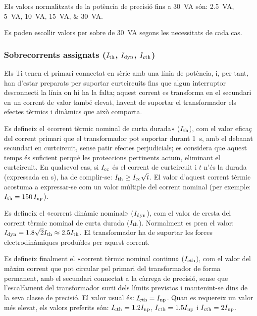  Els valors normalitzats de la potència de precisió fins a \qty{30}{VA}
són: \qtylist{2,5; 5;10; 15; 30}{VA}.

Es poden escollir valors per sobre de \qty{30}{VA} segons les necessitats de cada cas.

\subsubsection{Sobrecorrents  assignats ($I_\mathrm{th}$, $I_\mathrm{dyn}$, $I_\mathrm{cth}$)}

 Els Ti
tenen el primari connectat en sèrie amb una línia de potència, i, per tant, han
d'estar preparats per suportar curtcircuits fins que algun
interruptor desconnecti la línia on hi ha la falta; aquest
corrent es transforma en el secundari en un corrent de valor
també elevat, havent de suportar el transformador els efectes tèrmics
i dinàmics que això comporta.

Es defineix el «corrent tèrmic nominal de curta durada»
($I_\mathrm{th}$), com el valor eficaç del  corrent primari que el
transformador pot suportar durant \qty{1}{s}, amb el debanat
secundari en curtcircuit, sense patir efectes perjudicials; es
considera que aquest temps és suficient perquè les proteccions
pertinents actuïn, eliminant el curtcircuit. En qualsevol cas, si
$I_\mathrm{cc}$ és el corrent de curtcircuit i $t$ n'és la durada
(expressada en s), ha de complir-se: $I_\mathrm{th}\geq
I_\mathrm{cc}\sqrt{t}$. El valor d'aquest corrent tèrmic
acostuma a expressar-se com  un valor múltiple del corrent
nominal (per exemple: $I_\mathrm{th}=150\,I_\mathrm{np}$).

Es defineix el «corrent dinàmic nominal» ($I_\mathrm{dyn}$), com el
valor de cresta del corrent tèrmic nominal de curta durada ($I_\mathrm{th}$).
Normalment es pren el valor: $I_\mathrm{dyn} =
\num{1,8}\sqrt{2}I_\mathrm{th}\approx \num{2,5}I_\mathrm{th}$. El transformador ha de
suportar les forces electrodinàmiques produïdes per aquest corrent.

Es defineix finalment el «corrent tèrmic nominal continu» ($I_\mathrm{cth}$), com
el valor del màxim corrent que pot circular pel primari del
transformador  de forma permanent, amb el secundari connectat a la
càrrega de precisió, sense que l'escalfament del transformador surti
dels límits previstos i mantenint-se dins de la
seva classe de precisió. El valor usual és: $I_\mathrm{cth} = I_\mathrm{np}$. Quan es requereix un valor més elevat, els valors preferits són:
$I_\mathrm{cth} = \num{1,2}I_\mathrm{np}$, $I_\mathrm{cth} = \num{1,5}I_\mathrm{np}$ i $I_\mathrm{cth} = 2 I_\mathrm{np}$.


